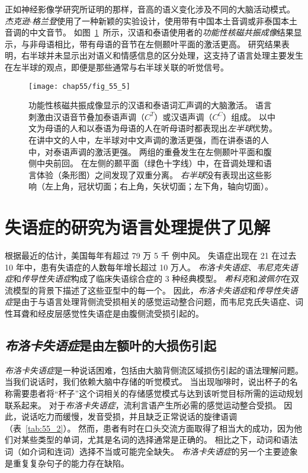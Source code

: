 正如神经影像学研究所证明的那样，音高的语义变化涉及不同的大脑活动模式。
\textit{杰克逊$\cdot$格兰登}使用了一种新颖的实验设计，使用带有中国本土音调或非泰国本土音调的中文音节。
如图~\ref{fig:55_5}~所示，汉语和泰语使用者的\textit{功能性核磁共振成像}结果显示，与非母语相比，带有母语的音节在左侧颞叶平面的激活更高。
研究结果表明，右半球并未显示出对语义和情感信息的区分处理，这支持了语言处理主要发生在左半球的观点，即便是那些通常与右半球关联的听觉信号。


\begin{figure}[htbp]
	\centering
	\texttt{[image: chap55/fig\_55\_5]}
	\caption{功能性核磁共振成像显示的汉语和泰语词汇声调的大脑激活。
		语言刺激由汉语音节叠加泰语声调（$ C^T $）或汉语声调（$ C^C $）组成。
		以中文为母语的人和以泰语为母语的人在听母语时都表现出\textit{左半球}优势。
		在讲中文的人中，左半球对中文声调的激活更强，而在讲泰语的人中，对泰语声调的激活更强。
		两组的重叠发生在左侧颞叶平面和腹侧中央前回。
		在左侧的颞平面（绿色十字线）中，在音调处理和语言体验（条形图）之间发现了双重分离。
		\textit{右半球}没有表现出这些影响\cite{xu2006activation}（左上角，冠状切面；右上角，矢状切面；左下角，轴向切面）。}
	\label{fig:55_5}
\end{figure}


\section{失语症的研究为语言处理提供了见解}

根据最近的估计，美国每年有超过 79 万 5 千 例中风。
失语症出现在 21%
在过去 10 年中，患有失语症的人数每年增长超过 10 万人。
\textit{布洛卡失语症}、\textit{韦尼克失语症}和\textit{传导性失语症}构成了临床失语综合症的 3 种经典模型。
\textit{希科克}和\textit{波佩尔}在双流模型的背景下描述了这些亚型中的每一个。
因此，\textit{布洛卡失语症}和\textit{传导性失语症}是由于与语言处理背侧流受损相关的感觉运动整合问题，而韦尼克氏失语症、词性耳聋和经皮层感觉性失语症是由腹侧流受损引起的。



\subsection{\textit{布洛卡失语症}是由左额叶的大损伤引起}

\textit{布洛卡失语症}是一种说话困难，包括由大脑背侧流区域损伤引起的语法理解问题。
当我们说话时，我们依赖大脑中存储的听觉模式。
当出现咖啡时，说出杯子的名称需要患者将“杯子”这个词相关的存储感觉模式与达到该听觉目标所需的运动规划联系起来。
对于\textit{布洛卡失语症}，流利言语产生所必需的感觉运动整合受损。
因此，说话吃力而缓慢，发音受损，并且缺乏正常说话的旋律语调（表~\ref{tab:55_2}）。
然而，患者有时在口头交流方面取得了相当大的成功，因为他们对某些类型的单词，尤其是名词的选择通常是正确的。
相比之下，动词和语法词（如介词和连词）选择不当或可能完全缺失。
\textit{布洛卡失语症}的另一个主要迹象是重复复杂句子的能力存在缺陷。


